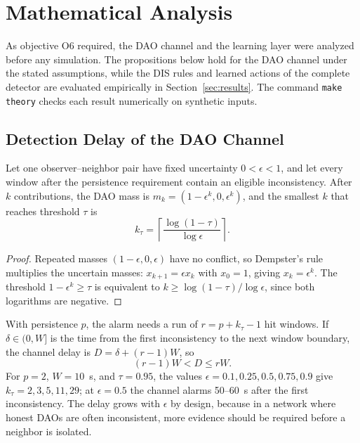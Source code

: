 \section{Mathematical Analysis}\label{sec:theory}
As objective O6 required, the DAO channel and the learning layer were analyzed before any simulation. The propositions below hold for the DAO channel under the stated assumptions, while the DIS rules and learned actions of the complete detector are evaluated empirically in Section~\ref{sec:results}. The command \texttt{make theory} checks each result numerically on synthetic inputs.

\subsection{Detection Delay of the DAO Channel}
\begin{proposition}\label{prop:accum}
Let one observer--neighbor pair have fixed uncertainty $0<\epsilon<1$, and let every window after the persistence requirement contain an eligible inconsistency. After $k$ contributions, the DAO mass is $m_k=(1-\epsilon^k,0,\epsilon^k)$, and the smallest $k$ that reaches threshold $\tau$ is
\begin{equation}
 k_\tau=\left\lceil\frac{\log(1-\tau)}{\log\epsilon}\right\rceil.
 \label{eq:kstar}
\end{equation}
\end{proposition}
\begin{proof}
Repeated masses $(1-\epsilon,0,\epsilon)$ have no conflict, so Dempster's rule multiplies the uncertain masses: $x_{k+1}=\epsilon x_k$ with $x_0=1$, giving $x_k=\epsilon^k$. The threshold $1-\epsilon^k\ge\tau$ is equivalent to $k\ge\log(1-\tau)/\log\epsilon$, since both logarithms are negative.
\end{proof}

With persistence $p$, the alarm needs a run of $r=p+k_\tau-1$ hit windows. If $\delta\in(0,W]$ is the time from the first inconsistency to the next window boundary, the channel delay is $D=\delta+(r-1)W$, so
\begin{equation}
 (r-1)W<D\le rW.
 \label{eq:delay}
\end{equation}
For $p=2$, $W=10$~s, and $\tau=0.95$, the values $\epsilon=0.1,0.25,0.5,0.75,0.9$ give $k_\tau=2,3,5,11,29$; at $\epsilon=0.5$ the channel alarms 50--60~s after the first inconsistency. The delay grows with $\epsilon$ by design, because in a network where honest DAOs are often inconsistent, more evidence should be required before a neighbor is isolated.

